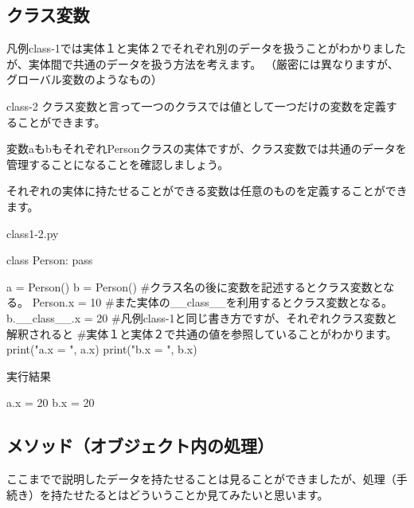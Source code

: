 \subsection{クラス変数}
凡例class-1では実体１と実体２でそれぞれ別のデータを扱うことがわかりましたが、実体間で共通のデータを扱う方法を考えます。
（厳密には異なりますが、グローバル変数のようなもの）
\begin{pabox}{class-2}
クラス変数と言って一つのクラスでは値として一つだけの変数を定義することができます。

変数aもbもそれぞれPersonクラスの実体ですが、クラス変数では共通のデータを管理することになることを確認しましょう。

それぞれの実体に持たせることができる変数は任意のものを定義することができます。

\begin{legbox}{class1-2.py}
\begin{listing}{1}
class Person:
    pass

a = Person()
b = Person()
#クラス名の後に変数を記述するとクラス変数となる。
Person.x = 10
#また実体の__class__を利用するとクラス変数となる。
b.__class__.x = 20
#凡例class-1と同じ書き方ですが、それぞれクラス変数と解釈されると
#実体１と実体２で共通の値を参照していることがわかります。
print("a.x = ", a.x)
print("b.x = ", b.x)
\end{listing}
実行結果
\begin{listing}{1}
a.x =  20
b.x =  20
\end{listing}

\end{legbox}


\end{pabox}

\subsection{メソッド（オブジェクト内の処理）}
ここまでで説明したデータを持たせることは見ることができましたが、処理（手続き）を持たせたるとはどういうことか見てみたいと思います。


